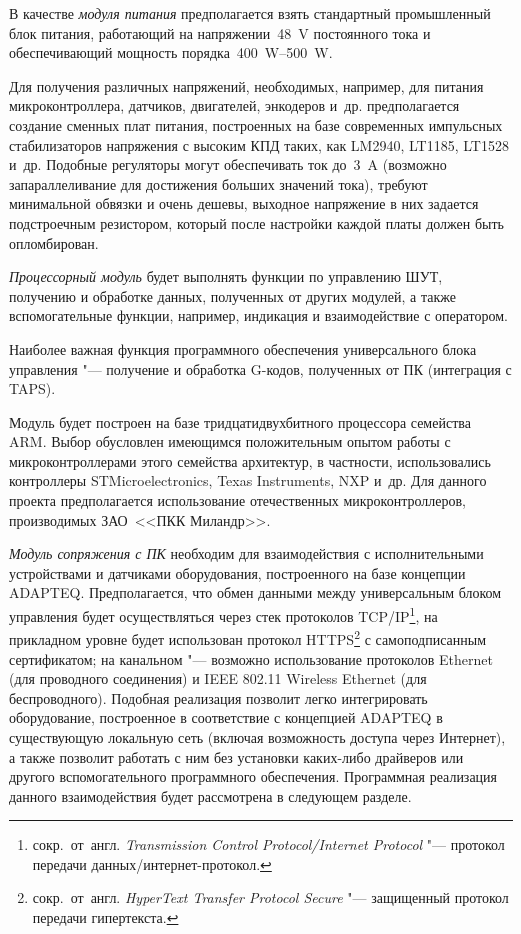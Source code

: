 В качестве \textit{модуля питания} предполагается взять стандартный промышленный блок питания, работающий на напряжении~\SI{48}{\volt} постоянного тока и обеспечивающий мощность порядка~\SIrange{400}{500}{\watt}.

Для получения различных напряжений, необходимых, например, для питания микроконтроллера, датчиков, двигателей, энкодеров и~др. предполагается создание сменных плат питания, построенных на базе современных импульсных стабилизаторов напряжения с высоким КПД таких, как \foreignlanguage{english}{LM}2940, \foreignlanguage{english}{LT}1185, \foreignlanguage{english}{LT}1528 и~др. Подобные регуляторы могут обеспечивать ток до~\SI{3}{\ampere} (возможно запараллеливание для достижения больших значений тока), требуют минимальной обвязки и очень дешевы, выходное напряжение в них задается подстроечным резистором, который после настройки каждой платы должен быть опломбирован.

\textit{Процессорный модуль} будет выполнять функции по управлению ШУТ, получению и обработке данных, полученных от других модулей, а также вспомогательные функции, например, индикация и взаимодействие с оператором.

Наиболее важная функция программного обеспечения универсального блока управления "--- получение и обработка \foreignlanguage{english}{G}-кодов, полученных от ПК (интеграция с \foreignlanguage{english}{TAPS}).

Модуль будет построен на базе тридцатидвухбитного процессора семейства \foreignlanguage{english}{ARM}. Выбор обусловлен имеющимся положительным опытом работы с микроконтроллерами этого семейства архитектур, в частности, использовались контроллеры \foreignlanguage{english}{STMicroelectronics}, \foreignlanguage{english}{Texas Instruments}, \foreignlanguage{english}{NXP} и~др. Для данного проекта предполагается использование отечественных микроконтроллеров, производимых ЗАО~<<ПКК Миландр>>.

\textit{Модуль сопряжения с ПК} необходим для взаимодействия с исполнительными устройствами и датчиками оборудования, построенного на базе концепции \foreignlanguage{english}{ADAPTEQ}. Предполагается, что обмен данными между универсальным блоком управления будет осуществляться через стек протоколов \foreignlanguage{english}{TCP/IP}\footnote{сокр.~от~англ. \textit{Transmission Control Protocol/Internet Protocol} "--- протокол передачи данных/интернет-протокол.}, на прикладном уровне будет использован протокол \foreignlanguage{english}{HTTPS}\footnote{сокр.~от~англ. \textit{HyperText Transfer Protocol Secure} "--- защищенный протокол передачи гипертекста.} с самоподписанным сертификатом; на канальном "--- возможно использование протоколов \foreignlanguage{english}{Ethernet} (для проводного соединения) и IEEE 802.11 Wireless Ethernet (для беспроводного). Подобная реализация позволит легко интегрировать оборудование, построенное в соответствие с концепцией \foreignlanguage{english}{ADAPTEQ} в существующую локальную сеть (включая возможность доступа через Интернет), а также позволит работать с ним без установки каких-либо драйверов или другого вспомогательного программного обеспечения. Программная реализация данного взаимодействия будет рассмотрена в следующем разделе.


